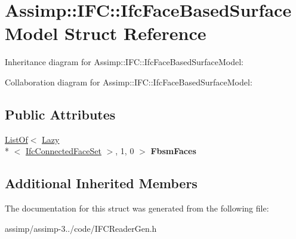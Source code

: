 \hypertarget{struct_assimp_1_1_i_f_c_1_1_ifc_face_based_surface_model}{\section{Assimp\+:\+:I\+F\+C\+:\+:Ifc\+Face\+Based\+Surface\+Model Struct Reference}
\label{struct_assimp_1_1_i_f_c_1_1_ifc_face_based_surface_model}
}


Inheritance diagram for Assimp\+:\+:I\+F\+C\+:\+:Ifc\+Face\+Based\+Surface\+Model\+:


Collaboration diagram for Assimp\+:\+:I\+F\+C\+:\+:Ifc\+Face\+Based\+Surface\+Model\+:
\subsection*{Public Attributes}
\begin{DoxyCompactItemize}
\item 
\hypertarget{struct_assimp_1_1_i_f_c_1_1_ifc_face_based_surface_model_a6b5ab2111a0e58852998de45f9bdfe35}{\hyperlink{struct_assimp_1_1_s_t_e_p_1_1_list_of}{List\+Of}$<$ \hyperlink{struct_assimp_1_1_s_t_e_p_1_1_lazy}{Lazy}\\*
$<$ \hyperlink{struct_assimp_1_1_i_f_c_1_1_ifc_connected_face_set}{Ifc\+Connected\+Face\+Set} $>$, 1, 0 $>$ {\bfseries Fbsm\+Faces}}\label{struct_assimp_1_1_i_f_c_1_1_ifc_face_based_surface_model_a6b5ab2111a0e58852998de45f9bdfe35}

\end{DoxyCompactItemize}
\subsection*{Additional Inherited Members}


The documentation for this struct was generated from the following file\+:\begin{DoxyCompactItemize}
\item 
assimp/assimp-\/3../code/I\+F\+C\+Reader\+Gen.\+h\end{DoxyCompactItemize}
